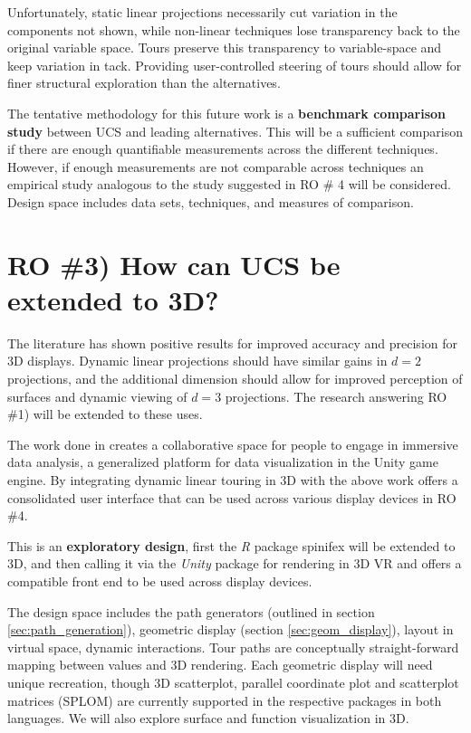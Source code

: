 \documentclass{monashthesis}
\begin{document}
Unfortunately, static linear projections necessarily cut variation in
the components not shown, while non-linear techniques lose transparency
back to the original variable space. Tours preserve this transparency to
variable-space and keep variation in tack. Providing user-controlled
steering of tours should allow for finer structural exploration than the
alternatives.

The tentative methodology for this future work is a \textbf{benchmark
comparison study} between UCS and leading alternatives. This will be a
sufficient comparison if there are enough quantifiable measurements
across the different techniques. However, if enough measurements are not
comparable across techniques an empirical study analogous to the study
suggested in RO \# 4 will be considered. Design space includes data
sets, techniques, and measures of comparison.

\section{RO \#3) How can UCS be extended to
3D?}\label{ro-3-how-can-ucs-be-extended-to-3d}

The literature has shown positive results for improved accuracy and
precision for 3D displays. Dynamic linear projections should have
similar gains in \(d=2\) projections, and the additional dimension
should allow for improved perception of surfaces and dynamic viewing of
\(d=3\) projections. The research answering RO \#1) will be extended to
these uses.

The work done in \textcite{cordeil_imaxes:_2017} creates a collaborative
space for people to engage in immersive data analysis, a generalized
platform for data visualization in the Unity game engine. By integrating
dynamic linear touring in 3D with the above work offers a consolidated
user interface that can be used across various display devices in RO
\#4.

This is an \textbf{exploratory design}, first the \emph{R} package
spinifex will be extended to 3D, and then calling it via the
\emph{Unity} package for rendering in 3D VR and offers a compatible
front end to be used across display devices.

The design space includes the path generators (outlined in section
\ref{sec:path_generation}), geometric display (section
\ref{sec:geom_display}), layout in virtual space, dynamic interactions.
Tour paths are conceptually straight-forward mapping between values and
3D rendering. Each geometric display will need unique recreation, though
3D scatterplot, parallel coordinate plot and scatterplot matrices
(SPLOM) are currently supported in the respective packages in both
languages. We will also explore surface and function visualization in
3D.
\end{document}
